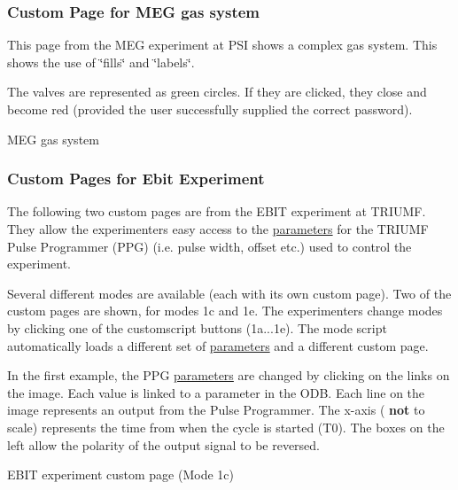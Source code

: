 \label{index_end}
\hypertarget{index_end}{}
  \subsubsection{Custom Page for MEG gas system}\label{RC_MEG_Gas_Page}
\par




\par


This page from the MEG experiment at PSI shows a complex gas system. This shows the use of \char`\"{}fills\char`\"{} and \char`\"{}labels\char`\"{}. \par
 The valves are represented as green circles. If they are clicked, they close and become red (provided the user successfully supplied the correct password). \par
 \begin{center} MEG gas system  \end{center}  \par




\par
 \label{index_end}
\hypertarget{index_end}{}
 \subsubsection{Custom Pages for Ebit Experiment}\label{RC_Ebit_custom_page}
\par




\par


The following two custom pages are from the EBIT experiment at TRIUMF. They allow the experimenters easy access to the \hyperlink{structparameters}{parameters} for the TRIUMF Pulse Programmer (PPG) (i.e. pulse width, offset etc.) used to control the experiment.

Several different modes are available (each with its own custom page). Two of the custom pages are shown, for modes 1c and 1e. The experimenters change modes by clicking one of the customscript buttons (1a...1e). The mode script automatically loads a different set of \hyperlink{structparameters}{parameters} and a different custom page.

In the first example, the PPG \hyperlink{structparameters}{parameters} are changed by clicking on the links on the image. Each value is linked to a parameter in the ODB. Each line on the image represents an output from the Pulse Programmer. The x-\/axis ( {\bfseries not} to scale) represents the time from when the cycle is started (T0). The boxes on the left allow the polarity of the output signal to be reversed. \par
 \begin{center} EBIT experiment custom page (Mode 1c)\par
\par
  \end{center}  \par
\par


